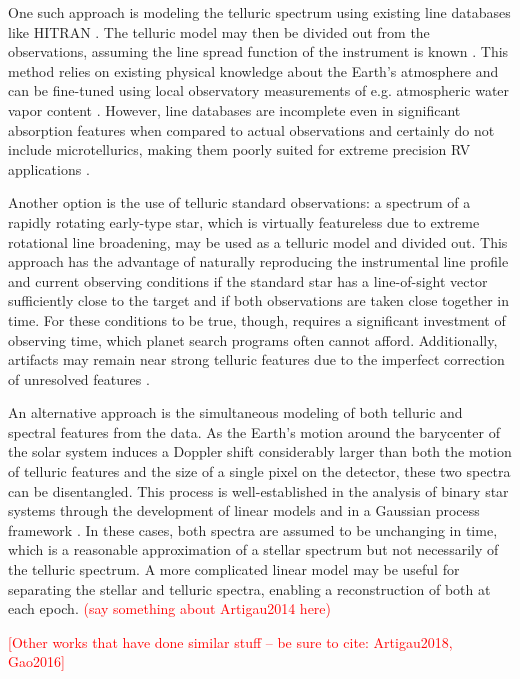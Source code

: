 \documentclass[twocolumn]{aastex62}
\newcommand{\todo}[1]{\textcolor{red}{#1}}  %
\begin{document}
One such approach is modeling the telluric spectrum using existing line databases like HITRAN \citep{HITRAN2016}. 
The telluric model may then be divided out from the observations, assuming the line spread function of the instrument is known \citep[e.g.][]{Seifahrt2010}. 
This method relies on existing physical knowledge about the Earth's atmosphere and can be fine-tuned using local observatory measurements of e.g. atmospheric water vapor content \citep{Baker2017}. 
However, line databases are incomplete even in significant absorption features when compared to actual observations and certainly do not include microtellurics, making them poorly suited for extreme precision RV applications \citep{Bertaux2014}.

Another option is the use of telluric standard observations: a spectrum of a rapidly rotating early-type star, which is virtually featureless due to extreme rotational line broadening, may be used as a telluric model and divided out. 
This approach has the advantage of naturally reproducing the instrumental line profile and current observing conditions if the standard star has a line-of-sight vector sufficiently close to the target and if both observations are taken close together in time. 
For these conditions to be true, though, requires a significant investment of observing time, which planet search programs often cannot afford. 
Additionally, artifacts may remain near strong telluric features due to the imperfect correction of unresolved features \citep{Bailey2007}.

An alternative approach is the simultaneous modeling of both telluric and spectral features from the data. 
As the Earth's motion around the barycenter of the solar system induces a Doppler shift considerably larger than both the motion of telluric features and the size of a single pixel on the detector, these two spectra can be disentangled.
This process is well-established in the analysis of binary star systems through the development of linear models
\citep[e.g.][]{Simon1994} and in a Gaussian process framework \citep{Czekala2017}.
In these cases, both spectra are assumed to be unchanging in time, which is a reasonable approximation of a stellar spectrum but not necessarily of the telluric spectrum.
A more complicated linear model may be useful for separating the stellar and telluric spectra, enabling a reconstruction of both at each epoch.
\todo{(say something about Artigau2014 here)} 

\todo{[Other works that have done similar stuff -- be sure to cite: Artigau2018, Gao2016]}
\end{document}

